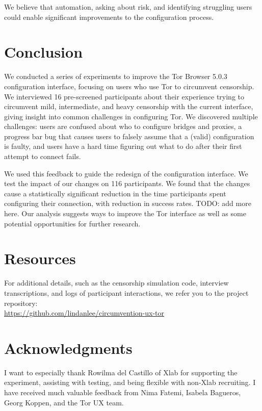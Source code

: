 \documentclass[USenglish,oneside,twocolumn]{article}
\begin{document}
We believe that automation, asking about risk, and identifying struggling users could enable significant improvements to the configuration process. 

\section{Conclusion} 
We conducted a series of experiments to improve the Tor Browser 5.0.3 configuration interface, focusing on users who use Tor to circumvent censorship. We interviewed 16 pre-screened participants about their experience trying to circumvent mild, intermediate, and heavy censorship with the current interface, giving insight into common challenges in configuring Tor. We discovered multiple challenges: users are confused about who to configure bridges and proxies, a progress bar bug that causes users to falsely assume that a (valid) configuration is faulty, and users have a hard time figuring out what to do after their first attempt to connect fails.

We used this feedback to guide the redesign of the configuration interface. We test the impact of our changes on 116 participants. We found that the changes cause a statistically significant reduction in the time participants spent configuring their connection, with reduction in success rates. {\color {red} TODO: add more here.} Our analysis suggests ways to improve the Tor interface as well as some potential opportunities for further research.

\section {Resources} 
For additional details, such as the censorship simulation code, interview transcriptions, and logs of participant interactions, we refer you to the project repository: \\

\noindent \url{https://github.com/lindanlee/circumvention-ux-tor}

\section {Acknowledgments}
I want to especially thank Rowilma del Castillo of Xlab for supporting the experiment, assisting with testing, and being flexible with non-Xlab recruiting. I have received much valuable feedback from Nima Fatemi, Isabela Bagueros, Georg Koppen, and the Tor UX team. 



\end{document}
